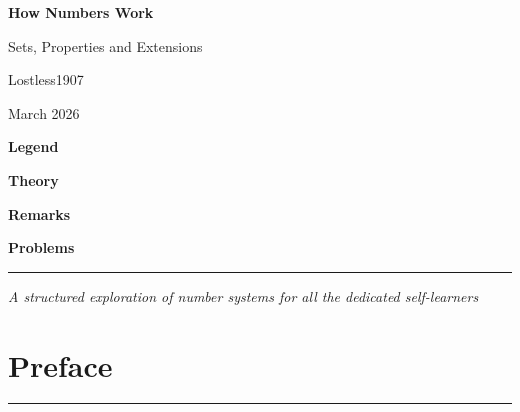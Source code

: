 \documentclass[11pt]{article}
\newcommand{\sepline}{
    \vspace{0.5em}
    \hrule
    \vspace{1em}
}
\begin{document}

\begin{titlepage}
    \centering
    
    \vspace*{3cm}
    
    {\Huge \bfseries How Numbers Work \par}
    
    \vspace{0.5cm}
    {\Large Sets, Properties and Extensions \par}
    
    \vspace{1.5cm}
    
    {\large Lostless1907 \par}
    {\large March 2026 \par}

    \vspace{1.5cm}

    \textbf{Legend}

    \vspace{0.5cm}

    \begin{tcolorbox}[colback=mypurple,colframe=purple!70!black,width=0.6\textwidth]
    \centering \textbf{Theory}
    \end{tcolorbox}

    \begin{tcolorbox}[colback=myblue,colframe=blue!60!black,width=0.6\textwidth]
    \centering \textbf{Remarks}
    \end{tcolorbox}

    \begin{tcolorbox}[colback=myred,colframe=red!70!black,width=0.6\textwidth]
    \centering \textbf{Problems}
    \end{tcolorbox}

    \vfill
    
    \sepline
    
    {\large \textit{A structured exploration of number systems for all the dedicated self-learners} \par}

\end{titlepage}

\newpage


\section*{Preface}
\sepline
\end{document}
